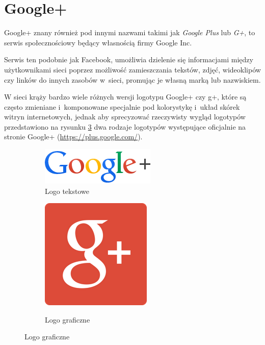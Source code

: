 \section{Google+}
\label{sec:google-plus}
Google+ znany również pod innymi nazwami takimi jak \emph{Google Plus} lub \emph{G+}, to serwis społecznościowy będący własnością firmy Google Inc.

Serwis ten podobnie jak Facebook, umożliwia dzielenie się informacjami między użytkownikami sieci poprzez możliwość zamieszczania tekstów, zdjęć, wideoklipów czy linków do innych zasobów w~sieci, promując je własną marką lub nazwiskiem.

W sieci krąży bardzo wiele różnych wersji logotypu Google+ czy g+, które są często zmieniane i~komponowane specjalnie pod kolorystykę i~układ skórek witryn internetowych, jednak aby sprecyzować rzeczywisty wygląd logotypów przedstawiono na rysunku \ref{fig:logo-google} dwa rodzaje logotypów występujące oficjalnie na stronie Google+ (\url{https://plus.google.com/}).

\begin{figure}[!h]
\centering
\begin{subfigure}{.5\textwidth}
  \centering
  \includegraphics[width=.4\linewidth]{images/googleplus_color.png}
  \caption{Logo tekstowe}
  \label{fig:google-logo-tekstowe}
\end{subfigure}%
\begin{subfigure}{.5\textwidth}
  \centering
  \scalebox{0.7}
  {
      \includegraphics[width=.4\linewidth]{images/google-plus-logo.png}
  }  
  \caption{Logo graficzne}
  \label{fig:google-logo-graficzne}
\end{subfigure}
\label{fig:logo-google}
\end{figure}

